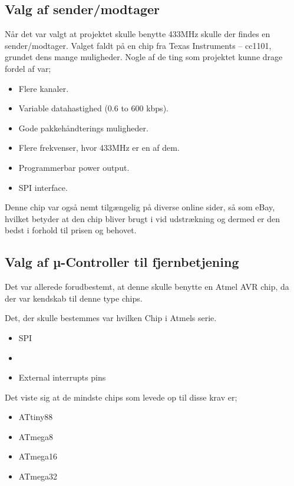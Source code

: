 \documentclass[Main]{subfiles}
\begin{document}
\subsection{Valg af sender/modtager}

Når det var valgt at projektet skulle benytte 433MHz skulle der findes en sender/modtager.
Valget faldt på en chip fra Texas Instruments -- cc1101\cite{TI-cc1101}, grundet dens mange muligheder.
Nogle af de ting som projektet kunne drage fordel af var;

\begin{itemize}
\item Flere kanaler.
\item Variable datahastighed (0.6 to 600 kbps).
\item Gode pakkehåndterings muligheder. 
\item Flere frekvenser, hvor 433MHz er en af dem.
\item Programmerbar power output.
\item SPI interface.
\end{itemize}

Denne chip var også nemt tilgængelig på diverse online sider, så som eBay\cite{eBay}, hvilket betyder at den chip bliver brugt i vid udstrækning og dermed er den bedst i forhold til prisen og behovet.




\subsection{Valg af µ-Controller til fjernbetjening}

Det var allerede forudbestemt, at denne skulle benytte en Atmel AVR chip, da der var kendskab til denne type chips.

Det, der skulle bestemmes var hvilken Chip i Atmels serie.

\begin{itemize}
\item SPI
\item \itoc
\item External interrupts pins
\end{itemize}

Det viste sig at de mindste chips som levede op til disse krav er;

\begin{itemize}
\item ATtiny88
\item ATmega8
\item ATmega16
\item ATmega32
\end{itemize}
\end{document}
